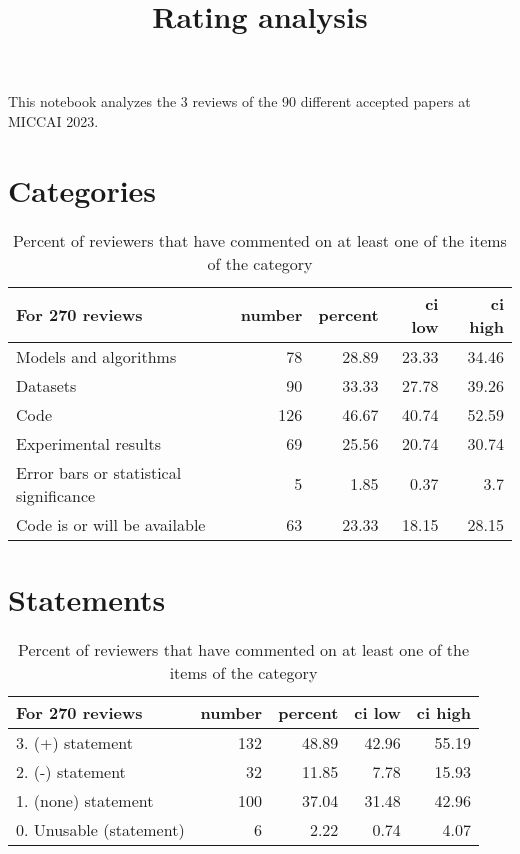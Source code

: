 \documentclass{article}
\title{Rating analysis}
\begin{document}
\maketitle

This notebook analyzes the 3 reviews of the 90 different accepted papers at MICCAI 2023.

\section{Categories} 

\begin{table}[H]

\centering

\begin{tabular}{lrrrr}
\hline
 For 270 reviews                        &   number &   percent &   ci low &   ci high \\
\hline
 Models and algorithms                  &       78 &     28.89 &    23.33 &     34.46 \\
 Datasets                               &       90 &     33.33 &    27.78 &     39.26 \\
 Code                                   &      126 &     46.67 &    40.74 &     52.59 \\
 Experimental results                   &       69 &     25.56 &    20.74 &     30.74 \\
 Error bars or statistical significance &        5 &      1.85 &     0.37 &      3.7  \\
 Code is or will be available           &       63 &     23.33 &    18.15 &     28.15 \\
\hline
\end{tabular}\caption{Percent of reviewers that have commented on at least one of the items of the category}

\end{table}



\section{Statements} 

\begin{table}[H]

\centering

\begin{tabular}{lrrrr}
\hline
 For 270 reviews         &   number &   percent &   ci low &   ci high \\
\hline
 3. (+) statement        &      132 &     48.89 &    42.96 &     55.19 \\
 2. (-) statement        &       32 &     11.85 &     7.78 &     15.93 \\
 1. (none) statement     &      100 &     37.04 &    31.48 &     42.96 \\
 0. Unusable (statement) &        6 &      2.22 &     0.74 &      4.07 \\
\hline
\end{tabular}\caption{Percent of reviewers that have commented on at least one of the items of the category}

\end{table}
\end{document}
